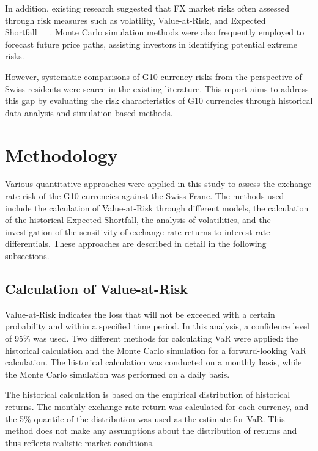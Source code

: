 \documentclass{article}
\begin{document}
In addition, existing research suggested that FX market risks often assessed through risk measures such as volatility, Value-at-Risk, and Expected Shortfall~\cite{AUBOIN_RUTA_2013}~\cite{dollar_exchange}~\cite{riker2020review}. Monte Carlo simulation methods were also frequently employed to forecast future price paths, assisting investors in identifying potential extreme risks.

However, systematic comparisons of G10 currency risks from the perspective of Swiss residents were scarce in the existing literature. This report aims to address this gap by evaluating the risk characteristics of G10 currencies through historical data analysis and simulation-based methods.

\section{Methodology}

Various quantitative approaches were applied in this study to assess the exchange rate risk of the G10 currencies against the Swiss Franc. The methods used include the calculation of Value-at-Risk through different models, the calculation of the historical Expected Shortfall, the analysis of volatilities, and the investigation of the sensitivity of exchange rate returns to interest rate differentials. These approaches are described in detail in the following subsections.

\subsection{Calculation of Value-at-Risk}

Value-at-Risk indicates the loss that will not be exceeded with a certain probability and within a specified time period. In this analysis, a confidence level of 95\% was used. Two different methods for calculating VaR were applied: the historical calculation and the Monte Carlo simulation for a forward-looking VaR calculation. The historical calculation was conducted on a monthly basis, while the Monte Carlo simulation was performed on a daily basis.

The historical calculation is based on the empirical distribution of historical returns. The monthly exchange rate return was calculated for each currency, and the 5\% quantile of the distribution was used as the estimate for VaR. This method does not make any assumptions about the distribution of returns and thus reflects realistic market conditions.
\end{document}
